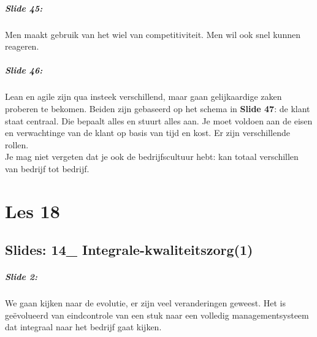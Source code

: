 \documentclass[10pt,a4paper]{report}
\begin{document}
\paragraph{Slide 45:} Men maakt gebruik van het wiel van competitiviteit. Men wil ook snel kunnen reageren.

\paragraph{Slide 46:} Lean en agile zijn qua insteek verschillend, maar gaan gelijkaardige zaken proberen te bekomen. Beiden zijn gebaseerd op het schema in \textbf{Slide 47}: de klant staat centraal. Die bepaalt alles en stuurt alles aan. Je moet voldoen aan de eisen en verwachtinge van de klant op basis van tijd en kost. Er zijn verschillende rollen.\\
Je mag niet vergeten dat je ook de bedrijfscultuur hebt: kan totaal verschillen van bedrijf tot bedrijf.

\chapter{Les 18}

\section{Slides: 14\_ Integrale-kwaliteitszorg(1)}

\paragraph{Slide 2:} We gaan kijken naar de evolutie, er zijn veel veranderingen geweest. Het is ge\"evolueerd van eindcontrole van een stuk naar een volledig managementsysteem dat integraal naar het bedrijf gaat kijken. 
\end{document}
